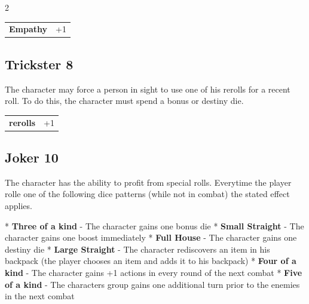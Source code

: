 \begin{multicols}{2}
\begin{tcolorbox}
\vspace{3mm}

\begin{tabular}{@{}ll@{}}
    \textbf{Empathy} & +1\\
\end{tabular}


\end{tcolorbox}

\begin{tcolorbox}
    \subsection*{Trickster \hfill \small{8 }}
    \tcblower
The character may force a person in sight to use one of his rerolls for a recent roll. To do this, the character must spend a bonus or destiny die.


\vspace{3mm}

\begin{tabular}{@{}ll@{}}
    \textbf{rerolls} & +1\\
\end{tabular}


\end{tcolorbox}

\begin{tcolorbox}
    \subsection*{Joker \hfill \small{10 }}
    \tcblower
The character has the ability to profit from special rolls. Everytime the player rolle one of the following dice patterns (while not in combat) the stated effect applies.

* \textbf{Three of a kind} - The character gains one bonus die
* \textbf{Small Straight} - The character gains one boost immediately
* \textbf{Full House} - The character gains one destiny die
* \textbf{Large Straight} - The character rediscovers an item in his backpack (the player chooses an item and adds it to his backpack)
* \textbf{Four of a kind} - The character gains +1 actions in every round of the next combat
* \textbf{Five of a kind} - The characters group gains one additional turn prior to the enemies in the next combat


\end{tcolorbox}
\end{multicols}
